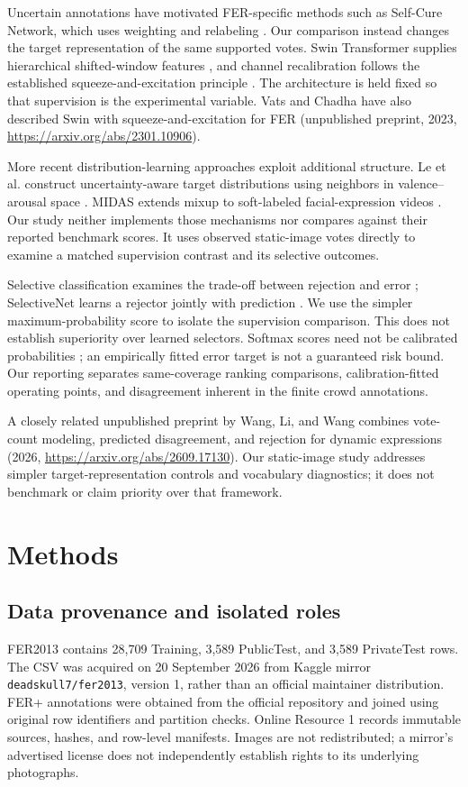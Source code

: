 \documentclass[pdflatex,sn-mathphys-num]{sn-jnl}
\begin{document}
Uncertain annotations have motivated FER-specific methods such as Self-Cure Network, which uses weighting and relabeling \cite{wang2020scn}. Our comparison instead changes the target representation of the same supported votes. Swin Transformer supplies hierarchical shifted-window features \cite{liu2021swin}, and channel recalibration follows the established squeeze-and-excitation principle \cite{hu2018senet}. The architecture is held fixed so that supervision is the experimental variable.
Vats and Chadha have also described Swin with squeeze-and-excitation for FER (unpublished preprint, 2023, \url{https://arxiv.org/abs/2301.10906}).

More recent distribution-learning approaches exploit additional structure. Le et al. construct uncertainty-aware target distributions using neighbors in valence--arousal space \cite{le2023uncertainty}. MIDAS extends mixup to soft-labeled facial-expression videos \cite{kawamura2024midas}. Our study neither implements those mechanisms nor compares against their reported benchmark scores. It uses observed static-image votes directly to examine a matched supervision contrast and its selective outcomes.

Selective classification examines the trade-off between rejection and error \cite{geifman2017selective}; SelectiveNet learns a rejector jointly with prediction \cite{geifman2019selectivenet}. We use the simpler maximum-probability score to isolate the supervision comparison. This does not establish superiority over learned selectors. Softmax scores need not be calibrated probabilities \cite{guo2017calibration}; an empirically fitted error target is not a guaranteed risk bound. Our reporting separates same-coverage ranking comparisons, calibration-fitted operating points, and disagreement inherent in the finite crowd annotations.

A closely related unpublished preprint by Wang, Li, and Wang combines vote-count modeling, predicted disagreement, and rejection for dynamic expressions (2026, \url{https://arxiv.org/abs/2609.17130}). Our static-image study addresses simpler target-representation controls and vocabulary diagnostics; it does not benchmark or claim priority over that framework.

\section{Methods}
\subsection{Data provenance and isolated roles}
FER2013 contains 28,709 Training, 3,589 PublicTest, and 3,589 PrivateTest rows. The CSV was acquired on 20 September 2026 from Kaggle mirror \texttt{deadskull7/fer2013}, version 1, rather than an official maintainer distribution. FER+ annotations were obtained from the official repository and joined using original row identifiers and partition checks. Online Resource 1 records immutable sources, hashes, and row-level manifests. Images are not redistributed; a mirror's advertised license does not independently establish rights to its underlying photographs.
\end{document}
